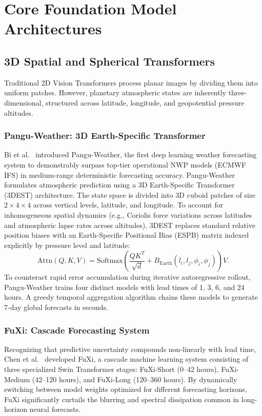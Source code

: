 \section{Core Foundation Model Architectures}
\label{sec:core_methods}

\subsection{3D Spatial and Spherical Transformers}
Traditional 2D Vision Transformers process planar images by dividing them into uniform patches. However, planetary atmospheric states are inherently three-dimensional, structured across latitude, longitude, and geopotential pressure altitudes.

\subsubsection{Pangu-Weather: 3D Earth-Specific Transformer}
Bi et al.~\cite{bi2023pangu} introduced Pangu-Weather, the first deep learning weather forecasting system to demonstrably surpass top-tier operational NWP models (ECMWF IFS) in medium-range deterministic forecasting accuracy. Pangu-Weather formulates atmospheric prediction using a 3D Earth-Specific Transformer (3DEST) architecture. The state space is divided into 3D cuboid patches of size $2 \times 4 \times 4$ across vertical levels, latitude, and longitude. To account for inhomogeneous spatial dynamics (e.g., Coriolis force variations across latitudes and atmospheric lapse rates across altitudes), 3DEST replaces standard relative position biases with an Earth-Specific Positional Bias (ESPB) matrix indexed explicitly by pressure level and latitude:
\begin{equation}
    \text{Attn}(Q, K, V) = \text{Softmax}\left(\frac{QK^T}{\sqrt{d}} + B_{\text{Earth}}(l_i, l_j, \phi_i, \phi_j)\right)V.
\end{equation}
To counteract rapid error accumulation during iterative autoregressive rollout, Pangu-Weather trains four distinct models with lead times of 1, 3, 6, and 24 hours. A greedy temporal aggregation algorithm chains these models to generate 7-day global forecasts in seconds.

\subsubsection{FuXi: Cascade Forecasting System}
Recognizing that predictive uncertainty compounds non-linearly with lead time, Chen et al.~\cite{chen2023fuxi} developed FuXi, a cascade machine learning system consisting of three specialized Swin Transformer stages: FuXi-Short (0--42 hours), FuXi-Medium (42--120 hours), and FuXi-Long (120--360 hours). By dynamically switching between model weights optimized for different forecasting horizons, FuXi significantly curtails the blurring and spectral dissipation common in long-horizon neural forecasts.

